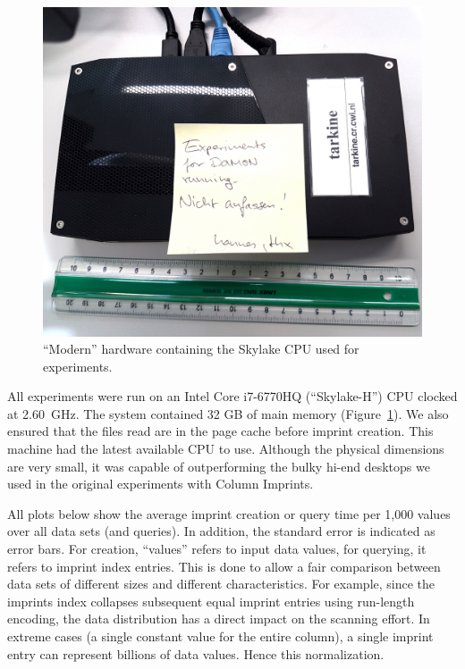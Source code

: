 \documentclass[sigconf]{acmart}
\begin{document}
\begin{figure}[h]
\begin{center}
\includegraphics[width=\columnwidth,trim=0mm 0mm 0mm 0mm,clip]{damon-box-tarkine.jpg}
\end{center}
\caption{``Modern'' hardware containing the Skylake CPU used for experiments.\label{fig:mach}}
\end{figure}

All experiments were run on an Intel Core i7-6770HQ (``Skylake-H'') CPU clocked at 2.60~GHz. The system contained 32 GB of main memory (Figure~\ref{fig:mach}). We also ensured that the files read are in the page cache before imprint creation. This machine had the latest available CPU to use. Although the physical dimensions are very small, it was capable of outperforming the bulky hi-end desktops we used in the original experiments with Column Imprints. 

All plots below show the average imprint creation or query time per 1,000 values over all data sets (and queries).  In addition, the standard error is indicated as error bars.  For creation, ``values'' refers to input data values, for querying, it refers to imprint index entries. This is done to allow a fair comparison between data sets of different sizes and different characteristics. For example, since the imprints index collapses subsequent equal imprint entries using run-length encoding, the data distribution has a direct impact on the scanning effort. In extreme cases (a single constant value for the entire column), a single imprint entry can represent billions of data values. Hence this normalization.
\end{document}
